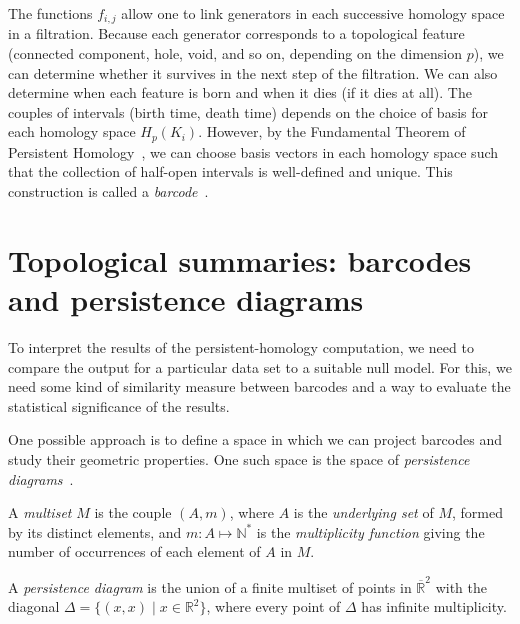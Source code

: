 \documentclass[a4paper,11pt,openany,extrafontsizes]{memoir}
\begin{document}
The functions $f_{i,j}$ allow one to link generators in each
successive homology space in a filtration. Because each generator
corresponds to a topological feature (connected component, hole, void,
and so on, depending on the dimension $p$), we can determine whether
it survives in the next step of the filtration. We can also determine
when each feature is born and when it dies (if it dies at all). The
couples of intervals (birth time, death time) depends on the choice of
basis for each homology space $H_p(K_i)$. However, by the Fundamental
Theorem of Persistent Homology~\cite{zomorodian_computing_2005}, we
can choose basis vectors in each homology space such that the
collection of half-open intervals is well-defined and unique. This
construction is called a \emph{barcode}~\cite{carlsson_topology_2009}.

\section{Topological summaries: barcodes and persistence diagrams}%
\label{sec:topol-summ}


To interpret the results of the persistent-homology computation, we
need to compare the output for a particular data set to a suitable
null model. For this, we need some kind of similarity measure between
barcodes and a way to evaluate the statistical significance of the
results.

One possible approach is to define a space in which we can project
barcodes and study their geometric properties. One such space is the
space of \emph{persistence
  diagrams}~\cite{edelsbrunner_computational_2010}.

\begin{defn}[Multiset]
  A \emph{multiset} $M$ is the couple $(A, m)$, where $A$ is the
  \emph{underlying set} of $M$, formed by its distinct elements, and
  $m : A\mapsto\mathbb{N}^*$ is the \emph{multiplicity function}
  giving the number of occurrences of each element of $A$ in $M$.
\end{defn}

\begin{defn}
  A \emph{persistence diagram} is the union of a finite multiset of
  points in $\overline{\mathbb{R}}^2$ with the diagonal
  $\Delta = \{(x,x) \;|\; x\in\mathbb{R}^2\}$, where every point of
  $\Delta$ has infinite multiplicity.
\end{defn}
\end{document}
